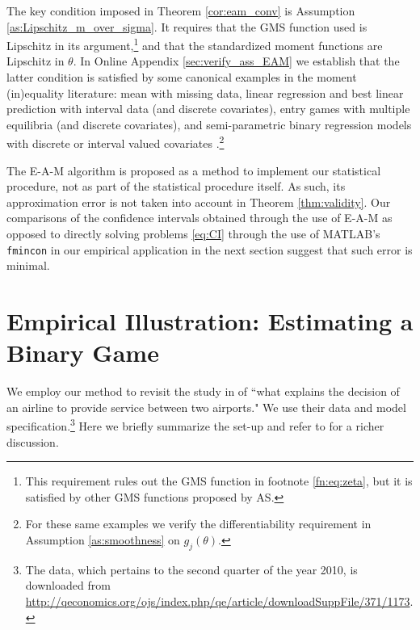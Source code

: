 \documentclass[letterpaper,11pt]{article}
\theoremstyle{myplain}
\theoremstyle{mydefinition}
\theoremstyle{myremark}
\renewcommand{\cite}{\citet}
\numberwithin{equation}{section}
\numberwithin{figure}{section}
\begin{document}
The key condition imposed in Theorem \ref{cor:eam_conv} is Assumption \ref{as:Lipschitz_m_over_sigma}. It requires that the GMS function used is Lipschitz in its argument,\footnote{\label{fn:gms}This requirement rules out the GMS function in footnote \ref{fn:eq:zeta}, but it is satisfied by other GMS functions proposed by AS.} and that the standardized moment functions are Lipschitz in $\theta$. In Online Appendix \ref{sec:verify_ass_EAM} we establish that the latter condition is satisfied by some canonical examples in the moment (in)equality literature: mean with missing data, linear regression and best linear prediction with interval data (and discrete covariates), entry games with multiple equilibria (and discrete covariates), and semi-parametric binary regression models with discrete or interval valued covariates \citep[as in][]{mag:mau08}.\footnote{For these same examples we verify the differentiability requirement in Assumption \ref{as:smoothness} on $g_j(\theta)$.}


\label{sentence:error:negligible}The E-A-M algorithm is proposed as a method to implement our statistical procedure, not as part of the statistical procedure itself. As such, its approximation error is not taken into account in Theorem \ref{thm:validity}. Our comparisons of the confidence intervals obtained through the use of E-A-M as opposed to directly solving problems \eqref{eq:CI} through the use of MATLAB's \texttt{fmincon} in our empirical application in the next section suggest that such error is minimal.

\section{Empirical Illustration: Estimating a Binary Game}
\label{sec:KT15}
We employ our method to revisit the study in \cite[Section 8]{KT15} of ``what explains the decision of an airline to provide service between two airports." We use their data and model specification.\footnote{The data, which pertains to the second quarter of the year 2010, is downloaded from \url{http://qeconomics.org/ojs/index.php/qe/article/downloadSuppFile/371/1173}.} Here we briefly summarize the set-up and refer to \cite{KT15} for a richer discussion.
\end{document}
